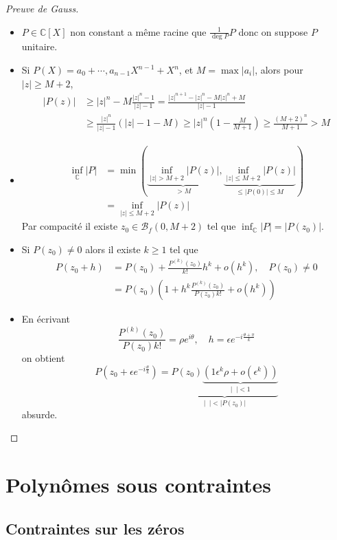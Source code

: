 \documentclass{article}
\theoremstyle{definition}
\begin{document}
\begin{proof}[Preuve de Gauss]
    \begin{itemize}
        \item $P\in \mathbb C[X]$ non constant a même racine que $\frac1{\deg P}P$ donc on suppose $P$ unitaire.
        \item Si $P(X)=a_0+\cdots, a_{n-1}X^{n-1}+X^n$, et $M=\max |a_i|$, alors pour $|z|\geq M+2$, \begin{align*}
                |P(z)|&\geq |z|^n-M\frac{|z|^n-1}{|z|-1}=\frac{|z|^{n+1}-|z|^n-M|z|^n+M}{|z|-1}\\
                      &\geq \frac{|z|^n}{|z|-1} \left( |z|-1-M \right)\geq |z|^n\left(1-\frac M{M+1}\right)\geq \frac{(M+2)^n}{M+1}>M
            \end{align*}
        \item \begin{align*}
                \inf_{\mathbb C}|P|&=\min\left(\underbrace{\inf_{|z|>M+2}|P(z)|}_{>M}, \underbrace{\inf_{|z|\leq M+2}|P(z)|}_{\leq |P(0)|\leq M}\right) \\&=\inf _{|z|\leq M+2}|P(z)|
            \end{align*}
            Par compacité il existe $z_0\in\mathcal B_f(0, M+2)$ tel que $\inf_{\mathbb C}|P|=|P(z_0)|$.
        \item Si $P(z_0)\neq 0$ alors il existe $k\geq 1$ tel que \begin{align*}
                P(z_0+h)&=P(z_0)+\frac{P^{(k)}(z_0)}{k!}h^k+o(h^k), \quad P(z_0)\neq 0 \\
                        &=P(z_0)\left(1+h^k\frac{P^{(k)}(z_0)}{P(z_0)k!}+o(h^k) \right)
            \end{align*}
        \item En écrivant \[
                \frac{P^{(k)}(z_0)}{P(z_0)k!}=\rho e^{i\theta}, \quad h=\epsilon e^{-i\frac{\theta+\pi}k}
            \]
            on obtient \[
                P(z_0+\epsilon e^{-i\frac\theta k})=\underbrace{P(z_0)\underbrace{\left(1 \epsilon^k \rho + o(\epsilon^k)\right)}_{|\;\;|<1}}_{|\;\;|<|P(z_0)|}
            \]
            absurde.
    \end{itemize}
\end{proof}

\section{Polynômes sous contraintes}

\subsection{Contraintes sur les zéros}
\end{document}
